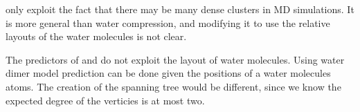 \documentclass{report}
\begin{document}
\citep{omeltchenko2000sls} only exploit the fact that there may be many dense
clusters in MD simulations. It is more general than water compression, and
modifying it to use the relative layouts of the water molecules is not clear.

The predictors of \citep{merrycomp} and \citep{gumholdcomp} do not exploit the
layout of water molecules. Using water dimer model prediction can be done
given the positions of a water molecules atoms. The creation of the spanning
tree would be different, since we know the expected degree of the verticies is
at most two.

\begin{table}[t]
\centering
{}
\end{table}
\end{document}
